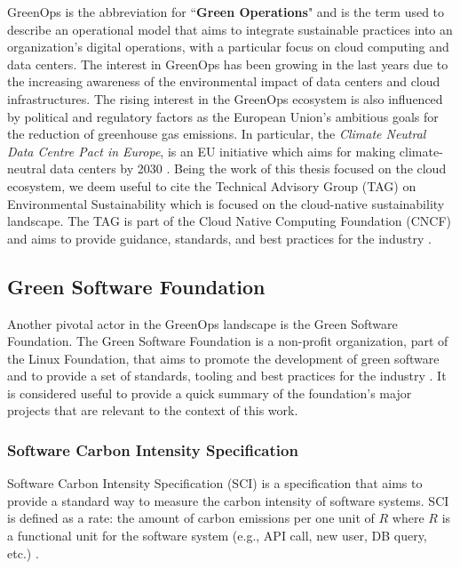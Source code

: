 GreenOps is the abbreviation for ``\textbf{Green Operations}" and is the term used to describe an operational model that aims to integrate sustainable practices into an organization's digital operations, with a particular focus on cloud computing and data centers.
The interest in GreenOps has been growing in the last years due to the increasing awareness of the environmental impact of data centers and cloud infrastructures.
The rising interest in the GreenOps ecosystem is also influenced by political and regulatory factors as the European Union's ambitious goals for the reduction of greenhouse gas emissions.
In particular, the \textit{Climate Neutral Data Centre Pact in Europe}, is an EU initiative which aims for making climate-neutral data centers by 2030 \cite{climate_neutral_data_centre_pact}.
Being the work of this thesis focused on the cloud ecosystem, we deem useful to cite the Technical Advisory Group (TAG) on Environmental Sustainability which is focused on the cloud-native sustainability landscape.
The TAG is part of the Cloud Native Computing Foundation (CNCF) and aims to provide guidance, standards, and best practices for the industry \cite{tag_env_sustainability}.


\subsection{Green Software Foundation}

Another pivotal actor in the GreenOps landscape is the Green Software Foundation.
The Green Software Foundation is a non-profit organization, part of the Linux Foundation, that aims to promote the development of green software and to provide a set of standards, tooling and best practices for the industry \cite{green_software_foundation}.
It is considered useful to provide a quick summary of the foundation's major projects that are relevant to the context of this work.

\subsubsection{Software Carbon Intensity Specification}

Software Carbon Intensity Specification (SCI) is a specification that aims to provide a standard way to measure the carbon intensity of software systems.
SCI is defined as a rate: the amount of carbon emissions per one unit of $R$ where $R$ is a functional unit for the software system (e.g., API call, new user, DB query, etc.) \cite{sci}.

